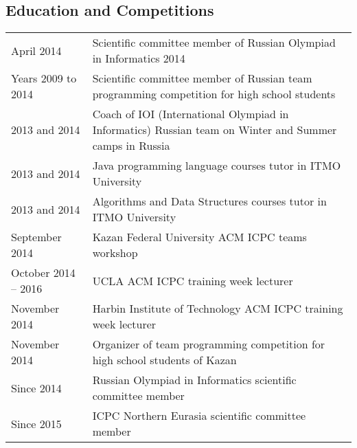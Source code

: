 \documentclass[11pt,a4paper,oneside]{article}
\begin{document}
\subsection{Education and Competitions}
\begin{center}
  \begin{tabular}{l|p{12 cm}}
    April 2014 & Scientific committee member of Russian Olympiad in Informatics 2014 \\
    Years 2009 to 2014 & Scientific committee member of Russian team programming competition for high school students \\
    2013 and 2014 & Coach of IOI (International Olympiad in Informatics) Russian team on Winter and Summer camps in Russia \\
    2013 and 2014 & Java programming language courses tutor in ITMO University \\
    2013 and 2014 & Algorithms and Data Structures courses tutor in ITMO University \\
    September 2014 & Kazan Federal University ACM ICPC teams workshop \\
    October  2014 -- 2016 & UCLA ACM ICPC training week lecturer \\
    November 2014 & Harbin Institute of Technology ACM ICPC training week lecturer \\
    November 2014 & Organizer of team programming competition for high school students of Kazan \\
    Since 2014 & Russian Olympiad in Informatics scientific committee member \\
    Since 2015 & ICPC Northern Eurasia scientific committee member \\
  \end{tabular}


\end{center}
\end{document}
